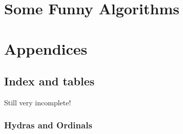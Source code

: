 \documentclass[a4paper]{book}
\begin{document}


\part{Some Funny Algorithms}



\part{Appendices}








\chapter*{Index and tables}

\begin{todo}
 Still very incomplete!
\end{todo}

\printindex


\section{Hydras and Ordinals}
\end{document}

